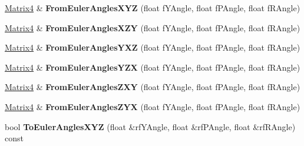 \begin{DoxyCompactItemize}
\item 
\hyperlink{class_i_dream_sky_1_1_matrix4}{Matrix4} \& {\bfseries From\+Euler\+Angles\+X\+YZ} (float f\+Y\+Angle, float f\+P\+Angle, float f\+R\+Angle)\hypertarget{class_i_dream_sky_1_1_matrix4_a2b811ae8a9c103a213326e1e64672d24}{}\label{class_i_dream_sky_1_1_matrix4_a2b811ae8a9c103a213326e1e64672d24}

\item 
\hyperlink{class_i_dream_sky_1_1_matrix4}{Matrix4} \& {\bfseries From\+Euler\+Angles\+X\+ZY} (float f\+Y\+Angle, float f\+P\+Angle, float f\+R\+Angle)\hypertarget{class_i_dream_sky_1_1_matrix4_ab696474e2545f9ca7b15d68a833d56fa}{}\label{class_i_dream_sky_1_1_matrix4_ab696474e2545f9ca7b15d68a833d56fa}

\item 
\hyperlink{class_i_dream_sky_1_1_matrix4}{Matrix4} \& {\bfseries From\+Euler\+Angles\+Y\+XZ} (float f\+Y\+Angle, float f\+P\+Angle, float f\+R\+Angle)\hypertarget{class_i_dream_sky_1_1_matrix4_ab2ada8981b89b0cf64e0e7721d47aa9e}{}\label{class_i_dream_sky_1_1_matrix4_ab2ada8981b89b0cf64e0e7721d47aa9e}

\item 
\hyperlink{class_i_dream_sky_1_1_matrix4}{Matrix4} \& {\bfseries From\+Euler\+Angles\+Y\+ZX} (float f\+Y\+Angle, float f\+P\+Angle, float f\+R\+Angle)\hypertarget{class_i_dream_sky_1_1_matrix4_a6769cea7981a4b03bae6dc870401c7f2}{}\label{class_i_dream_sky_1_1_matrix4_a6769cea7981a4b03bae6dc870401c7f2}

\item 
\hyperlink{class_i_dream_sky_1_1_matrix4}{Matrix4} \& {\bfseries From\+Euler\+Angles\+Z\+XY} (float f\+Y\+Angle, float f\+P\+Angle, float f\+R\+Angle)\hypertarget{class_i_dream_sky_1_1_matrix4_abf22c094184a056bdf83c85238cd429a}{}\label{class_i_dream_sky_1_1_matrix4_abf22c094184a056bdf83c85238cd429a}

\item 
\hyperlink{class_i_dream_sky_1_1_matrix4}{Matrix4} \& {\bfseries From\+Euler\+Angles\+Z\+YX} (float f\+Y\+Angle, float f\+P\+Angle, float f\+R\+Angle)\hypertarget{class_i_dream_sky_1_1_matrix4_a07090401f6c515b925399c259b71183b}{}\label{class_i_dream_sky_1_1_matrix4_a07090401f6c515b925399c259b71183b}

\item 
bool {\bfseries To\+Euler\+Angles\+X\+YZ} (float \&rf\+Y\+Angle, float \&rf\+P\+Angle, float \&rf\+R\+Angle) const \hypertarget{class_i_dream_sky_1_1_matrix4_ac5f051b68d33eb88c7657c5525089962}{}\label{class_i_dream_sky_1_1_matrix4_ac5f051b68d33eb88c7657c5525089962}


\end{DoxyCompactItemize}
